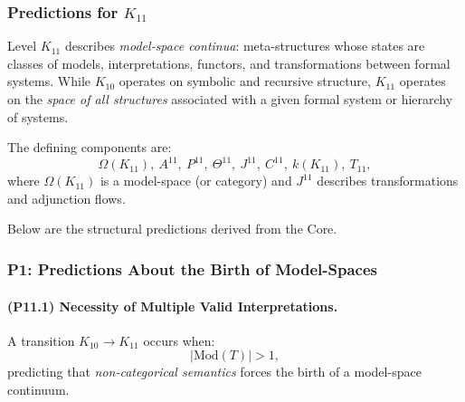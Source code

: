 

\subsubsection{Predictions for $K_{11}$}
\label{sec:predictions-k11}

Level $K_{11}$ describes \emph{model-space continua}: 
meta-structures whose states are classes of models,  
interpretations, functors, and transformations between 
formal systems.  
While $K_{10}$ operates on symbolic and recursive structure,  
$K_{11}$ operates on the \emph{space of all structures} 
associated with a given formal system or hierarchy of systems.

The defining components are:
\[
\Omega(K_{11}),\ 
A^{11},\ 
P^{11},\ 
\Theta^{11},\ 
J^{11},\ 
C^{11},\ 
k(K_{11}),\ 
T_{11},
\]
where $\Omega(K_{11})$ is a model-space (or category) and 
$J^{11}$ describes transformations and adjunction flows.

Below are the structural predictions derived from the Core.

\subsubsection{P1: Predictions About the Birth of Model-Spaces}

\paragraph{(P11.1) Necessity of Multiple Valid Interpretations.}
A transition $K_{10} \to K_{11}$ occurs when:
\[
|\mathrm{Mod}(T)| > 1,
\]
predicting that \emph{non-categorical semantics} forces 
the birth of a model-space continuum.

